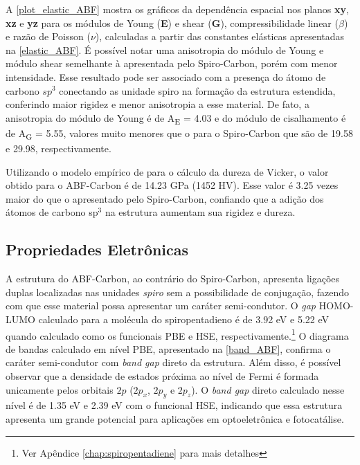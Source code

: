		A \autoref{plot_elastic_ABF} mostra os gráficos da dependência espacial nos planos \textbf{xy}, \textbf{xz} e \textbf{yz} para os módulos de Young (\textbf{E}) e shear (\textbf{G}), compressibilidade linear  ($\beta$) e razão de Poisson ($\nu$), calculadas a partir das constantes elásticas apresentadas na \autoref{elastic_ABF}. É possível notar uma anisotropia do módulo de Young e módulo shear semelhante à apresentada pelo Spiro-Carbon, porém com menor intensidade. Esse resultado pode ser associado com a presença do átomo de carbono $sp^3$ conectando as unidade spiro na formação da estrutura estendida, conferindo maior rigidez e menor anisotropia a esse material. De fato, a anisotropia do módulo de Young é de A\textsubscript{E} = 4.03 e do módulo de cisalhamento é de A\textsubscript{G} = 5.55, valores muito menores que o para o Spiro-Carbon que são de 19.58 e 29.98, respectivamente.
			
		Utilizando o modelo empírico de \citeauthor{chen2011modeling} para o cálculo  da dureza de Vicker, o valor obtido para o ABF-Carbon é de 14.23 GPa (1452 HV). Esse valor é 3.25 vezes maior do que o apresentado pelo Spiro-Carbon, confiando que a adição dos átomos de carbono sp$^3$ na estrutura aumentam sua rigidez e dureza.
		
	\subsection{Propriedades Eletrônicas}
		
		A estrutura do ABF-Carbon, ao contrário do Spiro-Carbon, apresenta ligações duplas localizadas nas unidades \textit{spiro} sem a possibilidade de conjugação, fazendo com que esse material possa apresentar um caráter semi-condutor. O \textit{gap} HOMO-LUMO calculado para a molécula do spiropentadieno é de 3.92 eV e 5.22 eV quando calculado como os funcionais PBE e HSE, respectivamente.\footnote{Ver Apêndice \autoref{chap:spiropentadiene} para mais detalhes} O diagrama de bandas calculado em nível PBE, apresentado na \autoref{band_ABF}, confirma o caráter semi-condutor com \textit{band gap} direto da estrutura. Além disso, é possível observar que a densidade de estados próxima ao nível de Fermi é formada unicamente pelos orbitais $2p$ ($2p_x$, $2p_y$ e $2p_z$). O \textit{band gap} direto calculado nesse nível é de 1.35 eV e 2.39 eV com o funcional HSE, indicando que essa estrutura apresenta um grande potencial para aplicações em optoeletrônica e fotocatálise.
		
